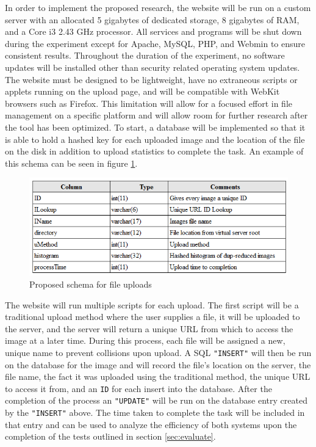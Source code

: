 \documentclass[11pt]{article}
\begin{document}
In order to implement the proposed research, the website will be run on a custom server with an allocated 5 gigabytes of dedicated storage, 8 gigabytes of RAM, and a Core i3 2.43 GHz processor. All services and programs will be shut down during the experiment except for Apache, MySQL, PHP, and Webmin to ensure consistent results. Throughout the duration of the experiment, no software updates will be installed other than security related operating system updates. The website must be designed to be lightweight, have no extraneous scripts or applets running on the upload page, and will be compatible with WebKit browsers such as Firefox. This limitation will allow for a focused effort in file management on a specific platform and will allow room for further research after the tool has been optimized. To start, a database will be implemented so that it is able to hold a hashed key for each uploaded image and the location of the file on the disk in addition to upload statistics to complete the task. An example of this schema can be seen in figure \ref{fig:schema}.

\begin{figure}[htbp]
\centering
\includegraphics[width=5in]{schema}
\caption{Proposed schema for file uploads}
\label{fig:schema}
\end{figure}

The website will run multiple scripts for each upload. The first script will be a traditional upload method where the user supplies a file, it will be uploaded to the server, and the server will return a unique URL from which to access the image at a later time. During this process, each file will be assigned a new, unique name to prevent collisions upon upload. A SQL {\tt "INSERT"} will then be run on the database for the image and will record the file's location on the server, the file name, the fact it was uploaded using the traditional method, the unique URL to access it from, and an {\tt ID} for each insert into the database. After the completion of the process an {\tt "UPDATE"} will be run on the database entry created by the {\tt "INSERT"} above. The time taken to complete the task will be included in that entry and can be used to analyze the efficiency of both systems upon the completion of the tests outlined in section \ref{sec:evaluate}.
\end{document}
